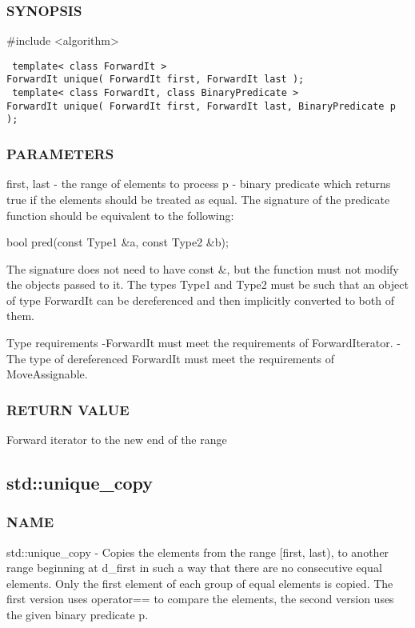 \subsubsection{SYNOPSIS}
\#include <algorithm>

\begin{lstlisting}
 template< class ForwardIt >
ForwardIt unique( ForwardIt first, ForwardIt last );
 template< class ForwardIt, class BinaryPredicate >
ForwardIt unique( ForwardIt first, ForwardIt last, BinaryPredicate p );
\end{lstlisting}

\subsubsection{PARAMETERS}
first, last - the range of elements to process
p - binary predicate which returns true  if the elements should be treated as equal.
The signature of the predicate function should be equivalent to the following:

 bool pred(const Type1 \&a, const Type2 \&b);

The signature does not need to have const \&, but the function must not modify the objects passed to it.
The types Type1 and Type2 must be such that an object of type ForwardIt can be dereferenced and then implicitly converted to both of them.


 Type requirements
 -ForwardIt must meet the requirements of ForwardIterator.
 -The type of dereferenced ForwardIt must meet the requirements of MoveAssignable.

\subsubsection{RETURN VALUE}
Forward iterator to the new end of the range



\subsection{std::unique\_copy}

\subsubsection{NAME}
std::unique\_copy - Copies the elements from the range [first, last), to another range beginning at d\_first in such a way that there are no consecutive equal elements. Only the first element of each group of equal elements is copied. The first version uses operator== to compare the elements, the second version uses the given binary predicate p.


